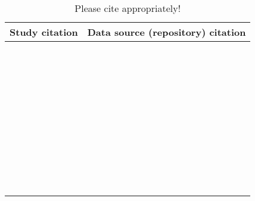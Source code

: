 \begin{table}[!tbp]
\caption{Please cite appropriately! \label{tab}} 
\begin{center}
\begin{tabular}{ll}
\hline\hline
\multicolumn{1}{c}{Study citation}&\multicolumn{1}{c}{Data source (repository) citation}\tabularnewline
\hline
\citet{Chan:2017aa}&\citet{Chan:2017aa}\tabularnewline
\citet{Chant:1966aa}&\citet{Novak:2020aa}\tabularnewline
\citet{Chong:2006aa}&\citet{Chong:2020aa}\tabularnewline
\citet{Colton:1983aa, Colton:1987aa}&\citet{Novak:2020aa}\tabularnewline
\citet{Crowley:1989aa}&\citet{Novak:2020aa}\tabularnewline
\citet{Edwards:1961aa}&\citet{Novak:2020aa}\tabularnewline
\citet{Elliott:2005aa}&\tabularnewline
\citet{Elliott:2006aa}&\tabularnewline
\citet{Eveleigh:1982aa}&\citet{Novak:2020aa}\tabularnewline
\citet{Fussmann:2005aa}&\citet{Fussmann:2020aa}\tabularnewline
\citet{Griffen:2007aa}&\citet{Novak:2020aa}\tabularnewline
\citet{Hassan:1976aa}&\citet{Novak:2020aa}\tabularnewline
\citet{Hossie:2016aa}&\citet{Hossie:2020aa}\tabularnewline
\citet{Huffaker:1982aa}&\citet{Novak:2020aa}\tabularnewline
\citet{Iyer:1996aa}&\citet{Novak:2020aa}\tabularnewline
\citet{Johnson:2006aa}&\citet{Novak:2020aa}\tabularnewline
\citet{Jones:1988aa, Jones:1986aa}&\citet{Novak:2020aa}\tabularnewline
\citet{Katz:1985ai}&\citet{Arditi:1990sp}\tabularnewline
\citet{Kfir:1983aa}&\citet{Novak:2020aa}\tabularnewline
\citet{Kratina:2009aa}&\citet{Kratina:2020aa}\tabularnewline
\citet{Krylov:1992aa}&\citet{Novak:2020aa}\tabularnewline
\citet{Kumar:1985aa}&\citet{Novak:2020aa}\tabularnewline
\citet{Lang:2012aa}&\citet{Lang:2020aa}\tabularnewline
\citet{Lester:2002aa}&\citet{Lester:2020aa}\tabularnewline
\citet{Long:2012aa}&\citet{Long:2020aa}\tabularnewline
\citet{Long:2012ab}&\citet{Long:2020ab}\tabularnewline
\citet{Mansour:1991aa}&\citet{Novak:2020aa}\tabularnewline
\citet{Mattila:1998aa}&\citet{Novak:2020aa}\tabularnewline
\citet{Medoc:2013aa}&\tabularnewline
\citet{Medoc:2015aa}&\tabularnewline
\citet{Mertz:1968aa}&\citet{Novak:2020aa}\tabularnewline
\citet{Mills:2004aa}&\citet{Novak:2020aa}\tabularnewline
\citet{Montoya:2000aa}&\citet{Novak:2020aa}\tabularnewline
\citet{Prokopenko:2017aa}&\citet{Prokopenko:2020aa}\tabularnewline
\citet{Ranta:1985aa}&\citet{Novak:2020aa}\tabularnewline
\citet{Reeve:1997aa}&\citet{Reeve:2020aa}\tabularnewline
\citet{Salt:1974aa}&\citet{Novak:2020aa}\tabularnewline
\citet{Uttley:1980aa}&\citet{Novak:2020aa}\tabularnewline
\citet{Vahl:2005aa}&\citet{Novak:2020aa}\tabularnewline
\citet{Von-Westernhagen:1976aa}&\citet{Novak:2020aa}\tabularnewline
\citet{Vucetich:2002aa}&\tabularnewline
\citet{Walde:1984aa}&\citet{Novak:2020aa}\tabularnewline
\citet{Wong:2005aa}&\citet{Wong:2020ab}\tabularnewline
\hline
\end{tabular}\end{center}
\end{table}
